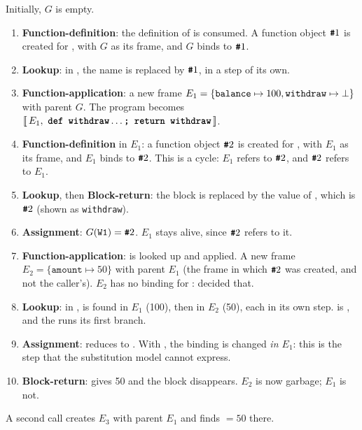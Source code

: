 Initially, $G$ is empty.
\begin{enumerate}
\item \textbf{Function-definition}: the definition of 
  is consumed. A function object $\textbf{\texttt{\#}}1$ is created
  for , with $G$ as its frame, and $G$ binds
   to $\textbf{\texttt{\#}}1$.
\item \textbf{Lookup}: in , the name
   is replaced by $\textbf{\texttt{\#}}1$, in a step of its own.
\item \textbf{Function-application}: a new frame
  $E_1 = \{\mathtt{balance} \mapsto 100, \mathtt{withdraw} \mapsto \bot\}$ with
  parent $G$. The program becomes
  $[\![\,E_1,\ \textbf{\texttt{def withdraw}}\ldots\textbf{\texttt{; return withdraw}}\,]\!]$.
\item \textbf{Function-definition} in $E_1$: a function object $\textbf{\texttt{\#}}2$ is
  created for , with $E_1$ as its frame, and $E_1$ binds
   to $\textbf{\texttt{\#}}2$. This is a cycle: $E_1$ refers to $\textbf{\texttt{\#}}2$,
  and $\textbf{\texttt{\#}}2$ refers to $E_1$.
\item \textbf{Lookup}, then \textbf{Block-return}: the block is replaced by
  the value of , which is $\textbf{\texttt{\#}}2$ (shown as
  \texttt{withdraw}).
\item \textbf{Assignment}: $G(\mathtt{W1}) = \textbf{\texttt{\#}}2$. $E_1$ stays alive, since
  $\textbf{\texttt{\#}}2$ refers to it.
\item \textbf{Function-application}:  is looked up and applied. A
  new frame $E_2 = \{\mathtt{amount} \mapsto 50\}$ with parent $E_1$ (the frame
  in which $\textbf{\texttt{\#}}2$ was created, and not the caller's). $E_2$ has no binding
  for :  decided that.
\item \textbf{Lookup}: in ,  is found
  in $E_1$ (100), then  in $E_2$ (50), each in its own step.
   is , and the  runs its first branch.
\item \textbf{Assignment}:  reduces to
  . With , the binding is changed
  \emph{in $E_1$}: this is the step that the substitution model
  cannot express.
\item \textbf{Block-return}:  gives 50 and the block
  disappears. $E_2$ is now garbage; $E_1$ is not.
\end{enumerate}
A second call  creates $E_3$ with parent $E_1$ and finds
 $= 50$ there.

